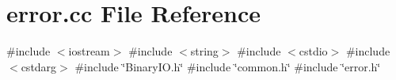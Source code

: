\section{error.\+cc File Reference}
\label{error_8cc}
{\ttfamily \#include $<$iostream$>$}\newline
{\ttfamily \#include $<$string$>$}\newline
{\ttfamily \#include $<$cstdio$>$}\newline
{\ttfamily \#include $<$cstdarg$>$}\newline
{\ttfamily \#include \char`\"{}Binary\+I\+O.\+h\char`\"{}}\newline
{\ttfamily \#include \char`\"{}common.\+h\char`\"{}}\newline
{\ttfamily \#include \char`\"{}error.\+h\char`\"{}}\newline
